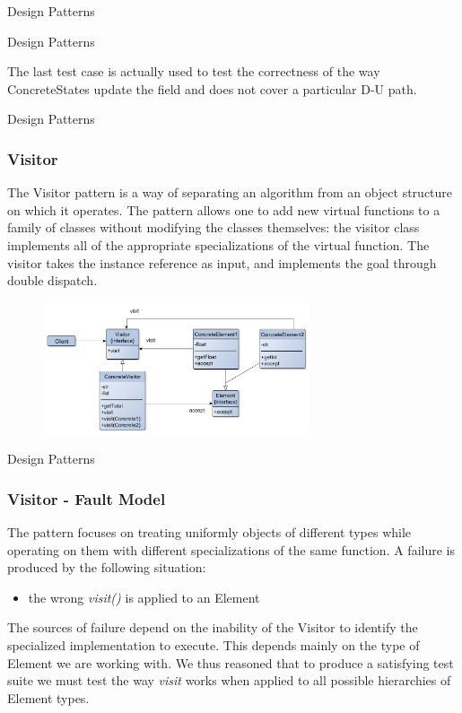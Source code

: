 \documentclass{beamer}
\begin{document}
\begin{section}{Design Patterns}
\begin{subsection}{Design Patterns}
\begin{frame}
The last test case is actually used to test the correctness of the way ConcreteStates update the field and does not cover a particular D-U path.
	
	\end{frame}
\end{subsection}

\begin{subsection}{Design Patterns}
	\begin{frame}
		\frametitle{Visitor}
The Visitor pattern is a way of separating an algorithm from an object structure on which it operates. {\footnotesize The pattern allows one to add new virtual functions to a family of classes without modifying the classes themselves: the visitor class implements all of the appropriate specializations of the virtual function. The visitor takes the instance reference as input, and implements the goal through double dispatch.}
		
\begin{figure}[!h]
	\centering
	\includegraphics[width=0.7\textwidth]{./Visitor/ClassDiagram.png}
	\label{ViclassDiag}
\end{figure}
		
	\end{frame}
\end{subsection}

\begin{subsection}{Design Patterns}
	\begin{frame}
		\frametitle{Visitor - Fault Model}
The pattern focuses on treating uniformly objects of different types while operating on them with different specializations of the same function. A failure is produced by the following situation:  
\begin{itemize}
	\item the wrong \textit{visit()} is applied to an Element
\end{itemize}
		\vspace{5mm}
The sources of failure depend on the inability of the Visitor to identify the specialized implementation to execute. This depends mainly on the type of Element we are working with. We thus reasoned that to produce a satisfying test suite we must test the way \textit{visit} works when applied to all possible hierarchies of Element types.
		

\end{frame}
\end{subsection}
\end{section}
\end{document}
